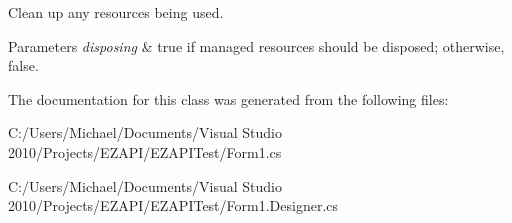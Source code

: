 Clean up any resources being used. 


\begin{DoxyParams}{Parameters}
{\em disposing} & true if managed resources should be disposed; otherwise, false.\\
\hline
\end{DoxyParams}


The documentation for this class was generated from the following files\-:\begin{DoxyCompactItemize}
\item 
C\-:/\-Users/\-Michael/\-Documents/\-Visual Studio 2010/\-Projects/\-E\-Z\-A\-P\-I/\-E\-Z\-A\-P\-I\-Test/Form1.\-cs\item 
C\-:/\-Users/\-Michael/\-Documents/\-Visual Studio 2010/\-Projects/\-E\-Z\-A\-P\-I/\-E\-Z\-A\-P\-I\-Test/Form1.\-Designer.\-cs\end{DoxyCompactItemize}

